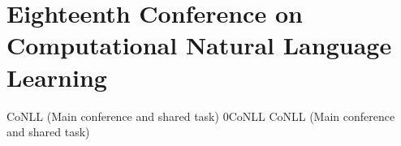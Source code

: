 \chapter[CoNLL: Thursday--Friday, June 26--27]{Eighteenth Conference on Computational Natural Language Learning}
\thispagestyle{emptyheader}
\vfill



\clearpage
\begin{wsschedule}
{CoNLL (Main conference and shared task)}
{0}{CoNLL}
{CoNLL (Main conference and shared task)}
{\CoNLLLoc}


\end{wsschedule}
